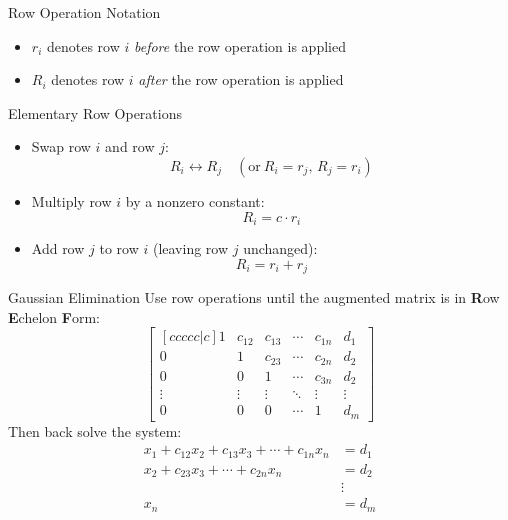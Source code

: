 \documentclass{beamer}
\begin{document}
\begin{frame}
\begin{block}{Row Operation Notation} 
\begin{itemize}
\item $r_i$ denotes row $i$ \emph{before} the row operation is applied
\item $R_i$ denotes row $i$ \emph{after} the row operation is applied
\end{itemize}
\end{block}\pause

\begin{block}{Elementary Row Operations} 
\begin{itemize}[<+- | alert@+>]
\item Swap row $i$ and row $j$:
\begin{equation*}
R_i\leftrightarrow R_j \quad\left(\text{or}\ R_i=r_j\text{, } R_j=r_i\right)
\end{equation*}
\item Multiply row $i$ by a nonzero constant:
\begin{equation*}
R_i=c\cdot r_i
\end{equation*}
\item Add row $j$ to row $i$ (leaving row $j$ unchanged):
\begin{equation*}
R_i=r_i+r_j
\end{equation*}
\end{itemize}
\end{block}
\end{frame}

\begin{frame}
\begin{block}{Gaussian Elimination}
\small
Use row operations until the augmented matrix is in \textbf{R}ow \textbf{E}chelon \textbf{F}orm\@:
\begin{equation*}
\begin{bmatrix}[ccccc|c]
1         & c_{12} & c_{13} & \cdots & c_{1n} & d_1\\
0         & 1         & c_{23} & \cdots & c_{2n} & d_2\\
0         & 0         & 1         & \cdots & c_{3n} & d_2\\
\vdots & \vdots  & \vdots &\ddots & \vdots & \vdots\\
0         & 0         & 0         & \cdots  & 1         & d_m
\end{bmatrix}
\end{equation*}\pause
Then back solve the system:
\begin{equation*}
\begin{aligned}
x_1 + c_{12}x_2+c_{13}x_3+\cdots+c_{1n}x_n  &= d_1\\
                    x_2+c_{23}x_3+\cdots+c_{2n}x_n  &= d_2\\
                                                                          &\vdots\\
                                                                   x_n &= d_m          
\end{aligned}
\end{equation*}
\end{block}
\end{frame}
\end{document}

